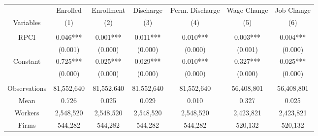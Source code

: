 \begin{tabular}{c|cccccc}
\toprule
\toprule
      & Enrolled & Enrollment & Discharge & Perm. Discharge & Wage Change & Job Change \\
Variables & (1) & (2) & (3) & (4) & (5) & (6) \\
\midrule
      &       &       &       &       &       &  \\
RPCI  & 0.046*** & 0.001*** & 0.011*** & 0.010*** & 0.003*** & 0.004*** \\
      & (0.001) & (0.000) & (0.000) & (0.000) & (0.001) & (0.000) \\
Constant & 0.725*** & 0.025*** & 0.029*** & 0.010*** & 0.327*** & 0.025*** \\
      & (0.000) & (0.000) & (0.000) & (0.000) & (0.000) & (0.000) \\
      &       &       &       &       &       &  \\
\midrule
Observations & 81,552,640 & 81,552,640 & 81,552,640 & 81,552,640 & 56,408,801 & 56,408,801 \\
Mean  & 0.726 & 0.025 & 0.029 & 0.010 & 0.327 & 0.025 \\
Workers & 2,548,520 & 2,548,520 & 2,548,520 & 2,548,520 & 2,423,821 & 2,423,821 \\
Firms & 544,282 & 544,282 & 544,282 & 544,282 & 520,132 & 520,132 \\
\bottomrule
\bottomrule
\end{tabular}%
